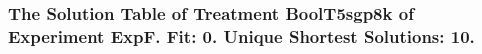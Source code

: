  \begin{frame}
 \fontsize{8pt}{9pt}\selectfont
 \frametitle{ The Solution Table of Treatment BoolT5sgp8k of Experiment ExpF. Fit: 0. Unique Shortest Solutions: 10. }

 \label{ExpFSolutionTable009.tex}  
 \end{frame}

